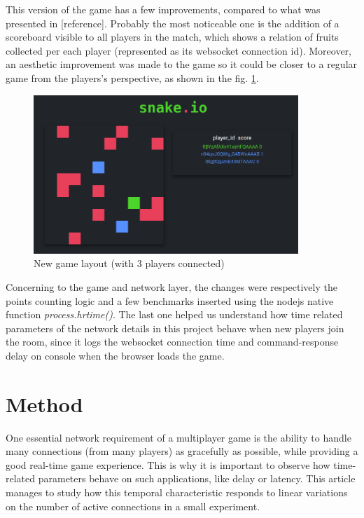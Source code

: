 \documentclass[english]{sbrt}
\begin{document}
This version of the game has a few improvements, compared to what was presented in [reference]. Probably the most noticeable one is the addition of a scoreboard visible to all players in the match, which shows a relation of fruits collected per each player (represented as its websocket connection id). Moreover, an aesthetic improvement was made to the game so it could be closer to a regular game from the players's perspective, as shown in the fig. \ref{screen}.

\begin{figure}[H]
  \centering
  \includegraphics[width=10cm]{graphs/screen.png}
  \caption{New game layout (with 3 players connected)}
  \label{screen}
\end{figure}

Concerning to the game and network layer, the changes were respectively the points counting logic and
a few benchmarks inserted using the nodejs native function \textit{process.hrtime()}. The last one helped us understand how time related parameters of the network details in this project behave when
new players join the room, since it logs the websocket connection time and command-response delay on console when the browser loads the game.

\section{\textbf{Method}}

One essential network requirement of a multiplayer game is the ability to handle many connections (from many players) as gracefully as possible, while providing a good real-time game experience. This is why it is important to observe how time-related parameters behave on such applications, like delay or latency. This article manages to study how this temporal characteristic responds to linear variations on the number of active connections in a small experiment.
\end{document}

